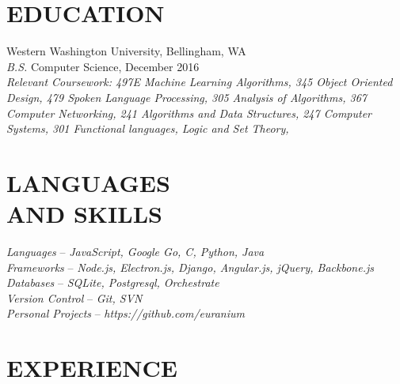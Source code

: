 \documentclass[line,margin]{res}
\begin{document}
\address{360.931.3237 $|$ rainierharvey@gmail.com $|$ http://nulldev.ninja $|$ github.com/euranium}

\begin{resume}

\section{EDUCATION}
	{\sf Western Washington University}, Bellingham, WA \\
	{\sl B.S.} Computer Science, { December 2016} \\
	{\sl Relevant Coursework: 497E { Machine Learning Algorithms}, 345 { Object Oriented Design}, 479 { Spoken Language Processing},
		305 { Analysis of Algorithms}, 367 { Computer Networking},
		241 { Algorithms and Data Structures}, 247 { Computer Systems},
		301 { Functional languages, Logic and Set Theory}, }

\section{LANGUAGES\\AND SKILLS}
	{\sl Languages} -- {\sl JavaScript, Google Go, C, Python, Java}\\
	{\sl Frameworks} -- {\sl Node.js, Electron.js, Django, Angular.js, jQuery, Backbone.js} \\
	{\sl Databases} -- {\sl SQLite, Postgresql, Orchestrate} \\
	{\sl Version Control} -- {\sl Git, SVN}\\
	{\sl Personal Projects} -- {\sl https://github.com/euranium}\\

\section{EXPERIENCE}


\end{resume}
\end{document}

